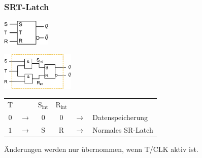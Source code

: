 \subsubsection{SRT-Latch}
\begin{center}
    \begin{minipage}[c]{0.4\linewidth}
        \includegraphics[width = 23mm]{images/srt_latch.jpeg}
    \end{minipage}
    \hfill
    \begin{minipage}[c]{0.55\linewidth}
        \includegraphics[width = 35mm]{images/srt_latch_cir.jpeg}
    \end{minipage}
\end{center}
\begin{flushleft}
    \begin{tabular}{c c c c c l}
        T & & $\text{S}_{\text{int}}$ & $\text{R}_{\text{int}}$ & &\\
        $0$ & $\rightarrow$ & $0$ & $0$ & $\rightarrow$ & Datenspeicherung\\
        $1$ & $\rightarrow$ & S & R & $\rightarrow$ & Normales SR-Latch\\
    \end{tabular}
\end{flushleft}
Änderungen werden nur übernommen, wenn T/CLK aktiv ist.


